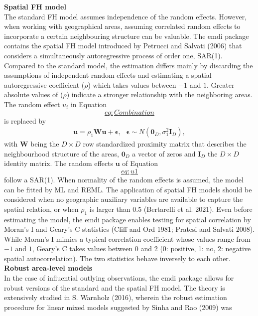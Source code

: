 \textbf{Spatial FH model}\\
The standard FH model assumes independence of the random effects.
However, when working with geographical areas, assuming correlated
random effects to incorporate a certain neighbouring structure can be
valuable. The emdi package contains the spatial FH model introduced by
Petrucci and Salvati (2006) that considers a simultaneously autoregressive process of
order one, SAR(1). Compared to the standard model, the estimation
differs mainly by discarding the assumptions of independent random
effects and estimating a spatial autoregressive coefficient (\(\rho\))
which takes values between \(-1\) and \(1\). Greater absolute values of
(\(\rho\)) indicate a stronger relationship with the neighboring areas.
The random effect \(u_i\) in
Equation~\protect\hyperlink{eq:Combination}{\[eq:Combination\]} is replaced by \[\begin{aligned}
\boldsymbol{u} = \rho_1 \boldsymbol{W} \boldsymbol{u} + \boldsymbol{\epsilon},
\text{   } \boldsymbol{\epsilon} \sim
N\left(\boldsymbol{0}_D,\sigma_{1}^2 \boldsymbol{I}_D\right),
\label{eq:u1}
\end{aligned}\] with \(\boldsymbol{W}\) being the \(D \times D\) row
standardized proximity matrix that describes the neighbourhood structure
of the areas, \(\boldsymbol{0}_D\) a vector of zeros and
\(\boldsymbol{I}_D\) the \(D \times D\) identity matrix. The random effects
\(\boldsymbol{u}\) of Equation~\protect\hyperlink{eq:u1}{\[eq:u1\]} follow a SAR(1). When normality of the random effects
is assumed, the model can be fitted by ML and REML. The application of
spatial FH models should be considered when no geographic auxiliary
variables are available to capture the spatial relation, or when
\(\rho_1\) is larger than 0.5 (Bertarelli et al. 2021). Even before estimating
the model, the emdi package enables testing for spatial correlation by
Moran's I and Geary's C statistics (Cliff and Ord 1981; Pratesi and Salvati 2008). While
Moran's I mimics a typical correlation coefficient whose values range
from \(-1\) and \(1\), Geary's C takes values between 0 and 2 (0: positive,
1: no, 2: negative spatial autocorrelation). The two statistics behave
inversely to each other.\\
\textbf{Robust area-level models}\\
In the case of influential outlying observations, the emdi package
allows for robust versions of the standard and the spatial FH model. The
theory is extensively studied in S. Warnholz (2016), wherein the robust
estimation procedure for linear mixed models suggested by Sinha and Rao (2009) was
